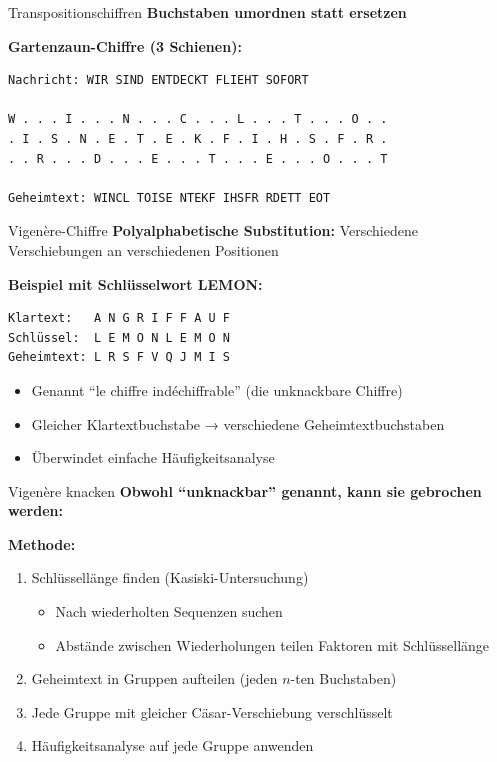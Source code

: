 \documentclass[handout]{beamer}
\begin{document}
\begin{frame}[fragile]{Transpositionschiffren}
\textbf{Buchstaben umordnen statt ersetzen}

\vspace{0.3cm}
\textbf{Gartenzaun-Chiffre (3 Schienen):}

\begin{verbatim}
Nachricht: WIR SIND ENTDECKT FLIEHT SOFORT

W . . . I . . . N . . . C . . . L . . . T . . . O . .
. I . S . N . E . T . E . K . F . I . H . S . F . R .
. . R . . . D . . . E . . . T . . . E . . . O . . . T

Geheimtext: WINCL TOISE NTEKF IHSFR RDETT EOT
\end{verbatim}

\end{frame}

\begin{frame}[fragile]{Vigenère-Chiffre}
\textbf{Polyalphabetische Substitution:} Verschiedene Verschiebungen an verschiedenen Positionen

\vspace{0.3cm}
\textbf{Beispiel mit Schlüsselwort LEMON:}
\begin{verbatim}
Klartext:   A N G R I F F A U F
Schlüssel:  L E M O N L E M O N
Geheimtext: L R S F V Q J M I S
\end{verbatim}

\vspace{0.3cm}
\begin{itemize}
    \item Genannt ``le chiffre indéchiffrable'' (die unknackbare Chiffre)
    \item Gleicher Klartextbuchstabe → verschiedene Geheimtextbuchstaben
    \item Überwindet einfache Häufigkeitsanalyse
\end{itemize}

\end{frame}

\begin{frame}{Vigenère knacken}
\textbf{Obwohl ``unknackbar'' genannt, kann sie gebrochen werden:}

\vspace{0.3cm}
\textbf{Methode:}
\begin{enumerate}
    \item Schlüssellänge finden (Kasiski-Untersuchung)
    \begin{itemize}
        \item Nach wiederholten Sequenzen suchen
        \item Abstände zwischen Wiederholungen teilen Faktoren mit Schlüssellänge
    \end{itemize}
    \item Geheimtext in Gruppen aufteilen (jeden $n$-ten Buchstaben)
    \item Jede Gruppe mit gleicher Cäsar-Verschiebung verschlüsselt
    \item Häufigkeitsanalyse auf jede Gruppe anwenden
\end{enumerate}
\end{frame}
\end{document}
